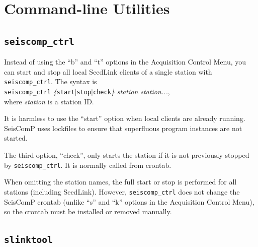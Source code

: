 \documentclass[11pt,a4paper,titlepage]{article}
\begin{document}
\section{Command-line Utilities}\label{commandline}

\subsection{\texttt{seiscomp\_ctrl}}

Instead of using the ``b'' and ``t'' options in the Acquisition Control Menu,
you can start and stop all local SeedLink clients of a single station with
\verb+seiscomp_ctrl+. The syntax is \\ \verb+seiscomp_ctrl+
\textit{\{}\texttt{start}$|$\texttt{stop}$|$\texttt{check}\textit{\} station
station...}, \\
where \textit{station} is a station ID.

It is harmless to use the ``start'' option when local clients are already
running. SeisComP uses lockfiles to ensure that superfluous program
instances are not started.

The third option, ``check'', only starts the station if it is not previously
stopped by \verb+seiscomp_ctrl+. It is normally called from crontab.

When omitting the station names, the full start or stop is performed
for all stations (including SeedLink). However, \verb+seiscomp_ctrl+
does not change the SeisComP crontab (unlike ``s'' and ``k'' options
in the Acquisition Control Menu), so the crontab must be installed or
removed manually.


\subsection{\texttt{slinktool}}\label{slinktool}
\end{document}
